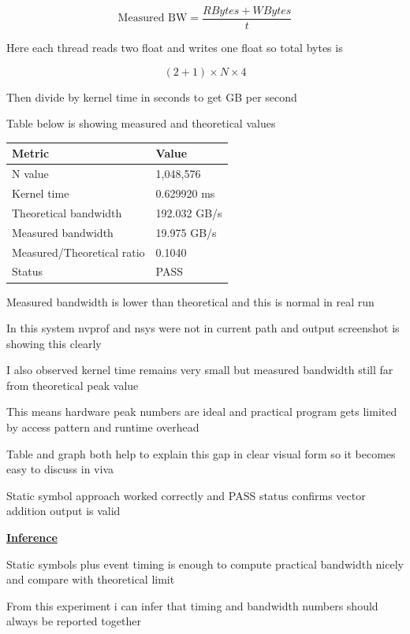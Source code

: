 \documentclass[12pt]{article}
\begin{document}
$$
\text{Measured BW} = \frac{RBytes + WBytes}{t}
$$

Here each thread reads two float and writes one float so total bytes is

$$
(2 + 1) \times N \times 4
$$

Then divide by kernel time in seconds to get GB per second

Table below is showing measured and theoretical values

\begin{center}
\begin{tabular}{|p{7cm}|p{5cm}|}
\hline
\textbf{Metric} & \textbf{Value} \\
\hline
N value & 1,048,576 \\
\hline
Kernel time & 0.629920 ms \\
\hline
Theoretical bandwidth & 192.032 GB/s \\
\hline
Measured bandwidth & 19.975 GB/s \\
\hline
Measured/Theoretical ratio & 0.1040 \\
\hline
Status & PASS \\
\hline
\end{tabular}
\end{center}

Measured bandwidth is lower than theoretical and this is normal in real run

In this system nvprof and nsys were not in current path and output screenshot is showing this clearly

I also observed kernel time remains very small but measured bandwidth still far from theoretical peak value

This means hardware peak numbers are ideal and practical program gets limited by access pattern and runtime overhead

Table and graph both help to explain this gap in clear visual form so it becomes easy to discuss in viva

Static symbol approach worked correctly and PASS status confirms vector addition output is valid

\newpage

\textbf{\Large \underline{Inference}}

\vspace{1cm}

Static symbols plus event timing is enough to compute practical bandwidth nicely and compare with theoretical limit

From this experiment i can infer that timing and bandwidth numbers should always be reported together
\end{document}
